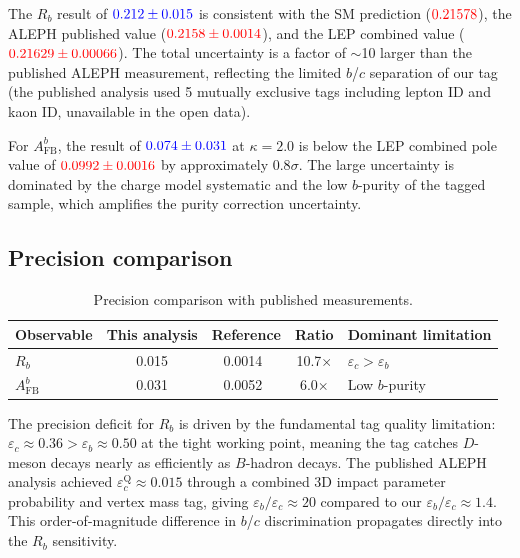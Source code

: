 \documentclass[11pt,a4paper]{article}
\newcommand{\measured}[1]{\textcolor{blue}{#1}}
\newcommand{\external}[1]{\textcolor{red}{#1}}
\begin{document}
The $R_b$ result of $\measured{0.212 \pm 0.015}$ is consistent
with the SM prediction ($\external{0.21578}$), the ALEPH published
value ($\external{0.2158 \pm 0.0014}$), and the LEP combined
value ($\external{0.21629 \pm 0.00066}$).
The total uncertainty is a factor of $\sim$10 larger than the
published ALEPH measurement, reflecting the limited $b$/$c$
separation of our tag (the published analysis used 5 mutually
exclusive tags including lepton ID and kaon ID, unavailable in
the open data).

For $A_\text{FB}^b$, the result of $\measured{0.074 \pm 0.031}$
at $\kappa = 2.0$ is below the LEP combined pole value of
$\external{0.0992 \pm 0.0016}$ by approximately $0.8\sigma$.
The large uncertainty is dominated by the charge model systematic
and the low $b$-purity of the tagged sample, which amplifies the
purity correction uncertainty.

\subsection{Precision comparison}
\label{sec:comparison:precision}

\begin{table}[htbp]
\centering
\caption{Precision comparison with published measurements.}
\label{tbl:precision}
\begin{tabular}{lcccl}
\toprule
Observable & This analysis & Reference & Ratio &
Dominant limitation \\
\midrule
$R_b$ & 0.015 & 0.0014~\cite{ALEPH:Rb:1996} & 10.7$\times$ &
  $\varepsilon_c > \varepsilon_b$ \\
$A_\text{FB}^b$ & 0.031 & 0.0052~\cite{ALEPH:AFBb} & 6.0$\times$ &
  Low $b$-purity \\
\bottomrule
\end{tabular}
\end{table}

The precision deficit for $R_b$ is driven by the fundamental
tag quality limitation: $\varepsilon_c \approx 0.36 >
\varepsilon_b \approx 0.50$ at the tight working point, meaning
the tag catches $D$-meson decays nearly as efficiently as
$B$-hadron decays.
The published ALEPH analysis achieved $\varepsilon_c^\text{Q} \approx
0.015$ through a combined 3D impact parameter probability
and vertex mass tag, giving $\varepsilon_b/\varepsilon_c
\approx 20$ compared to our $\varepsilon_b/\varepsilon_c \approx
1.4$.
This order-of-magnitude difference in $b$/$c$ discrimination
propagates directly into the $R_b$ sensitivity.
\end{document}

